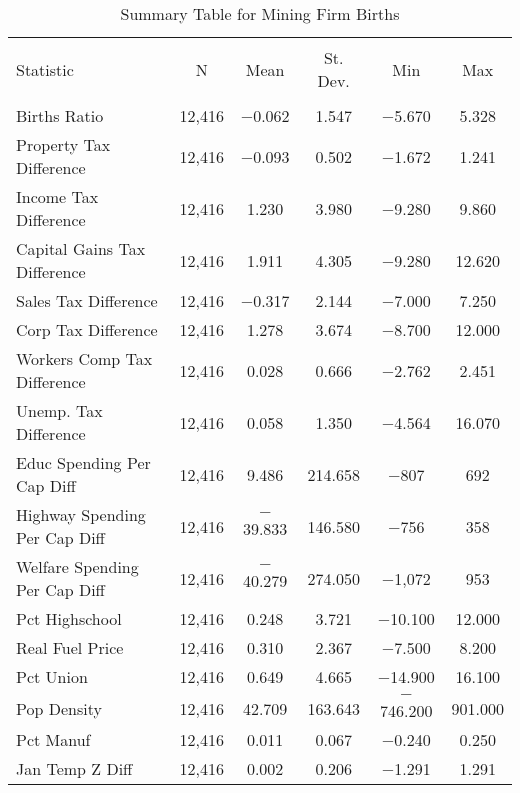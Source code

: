 
\begin{table}[!htbp] \centering 
  \caption{Summary Table for  Mining Firm Births} 
  \label{21summary} 
\begin{tabular}{@{\extracolsep{5pt}}lccccc} 
\\[-1.8ex]\hline 
\hline \\[-1.8ex] 
Statistic & \multicolumn{1}{c}{N} & \multicolumn{1}{c}{Mean} & \multicolumn{1}{c}{St. Dev.} & \multicolumn{1}{c}{Min} & \multicolumn{1}{c}{Max} \\ 
\hline \\[-1.8ex] 
Births Ratio & 12,416 & $-$0.062 & 1.547 & $-$5.670 & 5.328 \\ 
Property Tax Difference & 12,416 & $-$0.093 & 0.502 & $-$1.672 & 1.241 \\ 
Income Tax Difference & 12,416 & 1.230 & 3.980 & $-$9.280 & 9.860 \\ 
Capital Gains Tax Difference & 12,416 & 1.911 & 4.305 & $-$9.280 & 12.620 \\ 
Sales Tax Difference & 12,416 & $-$0.317 & 2.144 & $-$7.000 & 7.250 \\ 
Corp Tax Difference & 12,416 & 1.278 & 3.674 & $-$8.700 & 12.000 \\ 
Workers Comp Tax Difference & 12,416 & 0.028 & 0.666 & $-$2.762 & 2.451 \\ 
Unemp. Tax Difference & 12,416 & 0.058 & 1.350 & $-$4.564 & 16.070 \\ 
Educ Spending Per Cap Diff & 12,416 & 9.486 & 214.658 & $-$807 & 692 \\ 
Highway Spending Per Cap Diff & 12,416 & $-$39.833 & 146.580 & $-$756 & 358 \\ 
Welfare Spending Per Cap Diff & 12,416 & $-$40.279 & 274.050 & $-$1,072 & 953 \\ 
Pct Highschool & 12,416 & 0.248 & 3.721 & $-$10.100 & 12.000 \\ 
Real Fuel Price & 12,416 & 0.310 & 2.367 & $-$7.500 & 8.200 \\ 
Pct Union & 12,416 & 0.649 & 4.665 & $-$14.900 & 16.100 \\ 
Pop Density & 12,416 & 42.709 & 163.643 & $-$746.200 & 901.000 \\ 
Pct Manuf & 12,416 & 0.011 & 0.067 & $-$0.240 & 0.250 \\ 
Jan Temp Z Diff & 12,416 & 0.002 & 0.206 & $-$1.291 & 1.291 \\ 

\end{tabular}
\end{table}
